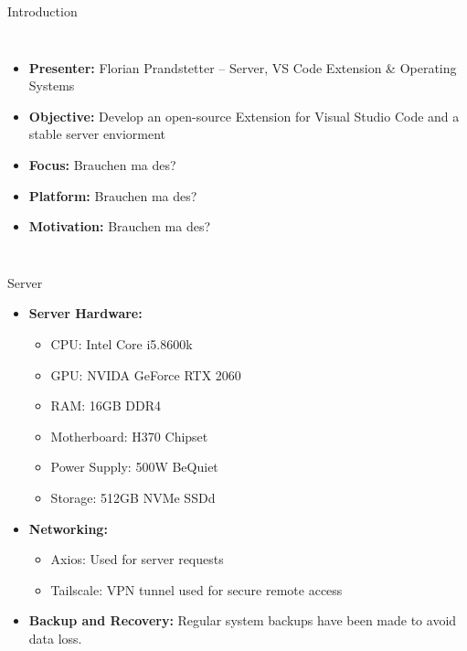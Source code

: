 \documentclass{beamer}
\begin{document}
\begin{frame}
  \maketitle
\end{frame}

\begin{frame}{Introduction}
  \begin{columns}
      \begin{itemize}
        \item \textbf{Presenter:} Florian Prandstetter – Server, VS Code Extension \& Operating Systems
        \item \textbf{Objective:} Develop an open-source Extension for Visual Studio Code and a stable server enviorment
        \item \textbf{Focus:} Brauchen ma des?
        \item \textbf{Platform:} Brauchen ma des?
        \item \textbf{Motivation:} Brauchen ma des?
      \end{itemize}
      \centering
  \end{columns}
\end{frame}



\begin{frame}{Server}
  \begin{itemize}
    \item \textbf{Server Hardware:}
      \begin{itemize}
        \item CPU: Intel Core i5.8600k
        \item GPU: NVIDA GeForce RTX 2060
        \item RAM: 16GB DDR4 
        \item Motherboard: H370 Chipset
        \item Power Supply: 500W BeQuiet
        \item Storage: 512GB NVMe SSDd
      \end{itemize}
    \item \textbf{Networking:}
      \begin{itemize}
        \item Axios: Used for server requests 
        \item Tailscale: VPN tunnel used for secure remote access 
      \end{itemize}
    \item \textbf{Backup and Recovery:} Regular system backups have been made to avoid data loss.      
  \end{itemize}
\end{frame}
\end{document}
